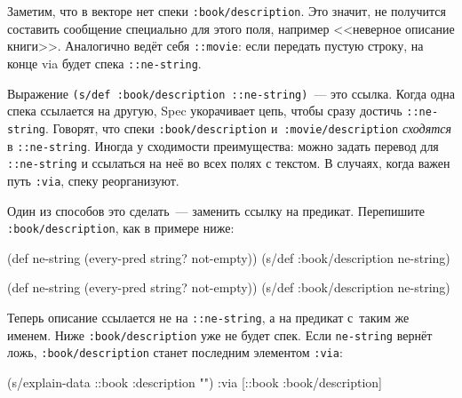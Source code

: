 \fi

Заметим, что в векторе нет спеки \texttt{:book/de\-scription}. Это значит, не
получится составить сообщение специально для этого поля, например <<неверное
описание книги>>. Аналогично ведёт себя \verb|::movie|: если передать
пустую строку, на конце via будет спека \verb|::ne-string|.

\mnoindent
Выражение \texttt{(s/def :book/description ::ne\--string)}~--- это
ссылка. Когда одна спека ссылается на другую, Spec укорачивает цепь, чтобы сразу
достичь \verb|::ne-string|. Говорят, что спеки \verb|:book/description|
и~\verb|:movie/description| \emph{сходятся} в \verb|::ne-string|. Иногда у
сходимости преимущества: можно задать перевод для \verb|::ne-string| и ссылаться
на неё во всех полях с текстом. В случаях, когда важен путь \verb|:via|, спеку
реорганизуют.

\mnoindent
Один из способов это сделать~--- заменить ссылку на предикат. Перепишите
\verb|:book/description|, как в примере ниже:

\ifx\DEVICETYPE\MOBILE

\begin{english}
  \begin{clojure}
(def ne-string
  (every-pred string? not-empty))
(s/def :book/description ne-string)
  \end{clojure}
\end{english}

\else

\begin{english}
  \begin{clojure}
(def ne-string (every-pred string? not-empty))
(s/def :book/description ne-string)
  \end{clojure}
\end{english}

\fi

\mnoindent
Теперь описание ссылается не на \verb|::ne-string|, а на предикат с~таким же
именем. Ниже \verb|:book/description| уже не будет спек. Если
\verb|ne-string| вернёт ложь, \verb|:book/description| станет последним
элементом \verb|:via|:

\ifx\DEVICETYPE\MOBILE

\begin{english}
  \begin{clojure}
(s/explain-data ::book
  {:description ""})
{:via [::book :book/description]}
  \end{clojure}
\end{english}


